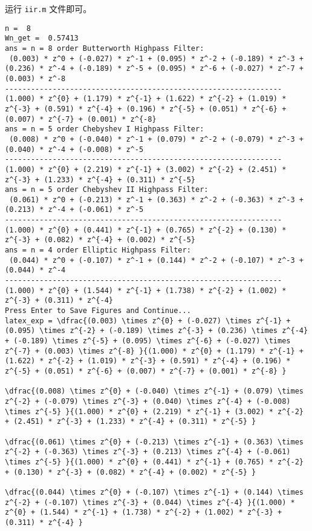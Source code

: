 \documentclass[lang=cn,11pt,a4paper,cite=authoryear]{elegantpaper}
\begin{document}
运行 \lstinline{iir.m} 文件即可。

\begin{lstlisting}[caption={IIR 实验输出}]
n =  8
Wn_get =  0.57413
ans = n = 8 order Butterworth Highpass Filter: 
 (0.003) * z^0 + (-0.027) * z^-1 + (0.095) * z^-2 + (-0.189) * z^-3 + (0.236) * z^-4 + (-0.189) * z^-5 + (0.095) * z^-6 + (-0.027) * z^-7 + (0.003) * z^-8 
----------------------------------------------------------------
(1.000) * z^{0} + (1.179) * z^{-1} + (1.622) * z^{-2} + (1.019) * z^{-3} + (0.591) * z^{-4} + (0.196) * z^{-5} + (0.051) * z^{-6} + (0.007) * z^{-7} + (0.001) * z^{-8} 
ans = n = 5 order Chebyshev I Highpass Filter: 
 (0.008) * z^0 + (-0.040) * z^-1 + (0.079) * z^-2 + (-0.079) * z^-3 + (0.040) * z^-4 + (-0.008) * z^-5 
----------------------------------------------------------------
(1.000) * z^{0} + (2.219) * z^{-1} + (3.002) * z^{-2} + (2.451) * z^{-3} + (1.233) * z^{-4} + (0.311) * z^{-5} 
ans = n = 5 order Chebyshev II Highpass Filter: 
 (0.061) * z^0 + (-0.213) * z^-1 + (0.363) * z^-2 + (-0.363) * z^-3 + (0.213) * z^-4 + (-0.061) * z^-5 
----------------------------------------------------------------
(1.000) * z^{0} + (0.441) * z^{-1} + (0.765) * z^{-2} + (0.130) * z^{-3} + (0.082) * z^{-4} + (0.002) * z^{-5} 
ans = n = 4 order Elliptic Highpass Filter: 
 (0.044) * z^0 + (-0.107) * z^-1 + (0.144) * z^-2 + (-0.107) * z^-3 + (0.044) * z^-4 
----------------------------------------------------------------
(1.000) * z^{0} + (1.544) * z^{-1} + (1.738) * z^{-2} + (1.002) * z^{-3} + (0.311) * z^{-4} 
Press Enter to Save Figures and Continue...
latex_exp = \dfrac{(0.003) \times z^{0} + (-0.027) \times z^{-1} + (0.095) \times z^{-2} + (-0.189) \times z^{-3} + (0.236) \times z^{-4} + (-0.189) \times z^{-5} + (0.095) \times z^{-6} + (-0.027) \times z^{-7} + (0.003) \times z^{-8} }{(1.000) * z^{0} + (1.179) * z^{-1} + (1.622) * z^{-2} + (1.019) * z^{-3} + (0.591) * z^{-4} + (0.196) * z^{-5} + (0.051) * z^{-6} + (0.007) * z^{-7} + (0.001) * z^{-8} }

\dfrac{(0.008) \times z^{0} + (-0.040) \times z^{-1} + (0.079) \times z^{-2} + (-0.079) \times z^{-3} + (0.040) \times z^{-4} + (-0.008) \times z^{-5} }{(1.000) * z^{0} + (2.219) * z^{-1} + (3.002) * z^{-2} + (2.451) * z^{-3} + (1.233) * z^{-4} + (0.311) * z^{-5} }

\dfrac{(0.061) \times z^{0} + (-0.213) \times z^{-1} + (0.363) \times z^{-2} + (-0.363) \times z^{-3} + (0.213) \times z^{-4} + (-0.061) \times z^{-5} }{(1.000) * z^{0} + (0.441) * z^{-1} + (0.765) * z^{-2} + (0.130) * z^{-3} + (0.082) * z^{-4} + (0.002) * z^{-5} }

\dfrac{(0.044) \times z^{0} + (-0.107) \times z^{-1} + (0.144) \times z^{-2} + (-0.107) \times z^{-3} + (0.044) \times z^{-4} }{(1.000) * z^{0} + (1.544) * z^{-1} + (1.738) * z^{-2} + (1.002) * z^{-3} + (0.311) * z^{-4} }
\end{lstlisting}
\end{document}
